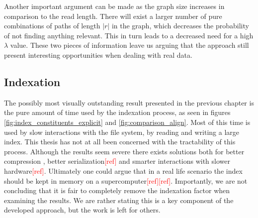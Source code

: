 \documentclass[thesis.tex]{subfiles}
\begin{document}
Another important argument can be made as the graph size increases in comparison to the read length. There will exist a larger number of pure combinations of paths of length $|r|$ in the graph, which decreases the probability of not finding anything relevant. This in turn leads to a decreased need for a high $\lambda$ value. These two pieces of information leave us arguing that the approach still present interesting opportunities when dealing with real data.
\begin{figure}
\caption{}
\label{fig:projected_lambda}
\end{figure}
\subsection*{Indexation}
The possibly most visually outstanding result presented in the previous chapter is the pure amount of time used by the indexation process, as seen in figures \ref{fig:index_constituents_explicit} and \ref{fig:comparison_align}. Most of this time is used by slow interactions with the file system, by reading and writing a large index. This thesis has not at all been concerned with the tractability of this process. Although the results seem severe there exists solutions both for better compression \cite{a_block_sorting_lossless_data_compression_algorithm}\cite{compression}, better serialization\textcolor{red}{[ref]} and smarter interactions with slower hardware\textcolor{red}{[ref]}. Ultimately one could argue that in a real life scenario the index should be kept in memory on a supercomputer\textcolor{red}{[ref]}\textcolor{red}{[ref]}. Importantly, we are not concluding that it is fair to completely remove the indexation factor when examining the results. We are rather stating this is a key component of the developed approach, but the work is left for others.
\end{document}
